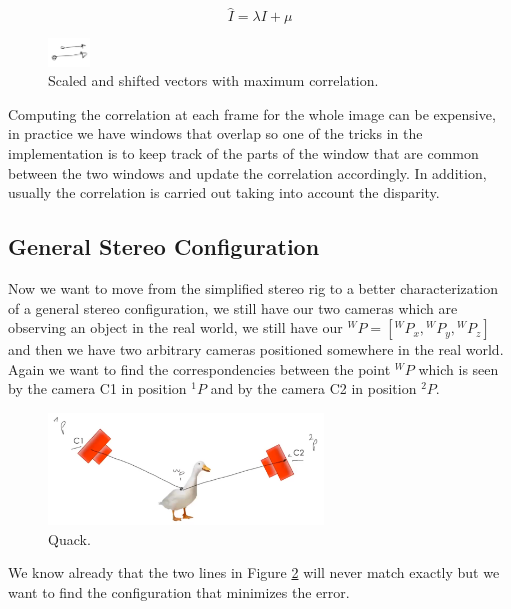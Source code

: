 \begin{multicols}{2}
\[
\hat{I} = \lambda I + \mu
\]
\begin{figure}[H]
    \centering
    \includegraphics[width=0.1\textwidth]{Figures/vectors.png}
    \caption{Scaled and shifted vectors with maximum correlation.}
    \label{fig:vectors}
\end{figure}
\end{multicols}

Computing the correlation at each frame for the whole image
can be expensive, in practice we have windows that overlap so one of the tricks in the implementation is to keep track of the parts of the window that are common between the two windows and update the correlation accordingly. In addition, usually the correlation is carried out taking into account the disparity.

\subsection{General Stereo Configuration}

Now we want to move from the simplified stereo rig to a better characterization of a general stereo configuration, we still have our two cameras which are observing an object in the real world, we still have our \({}^WP=[{}^WP_x, {}^WP_y,{}^WP_z]\) and then we have two arbitrary cameras positioned somewhere in the real world. Again we want to find the correspondencies between the point \({}^WP\) which is seen by the camera C1 in position \({}^1P\) and by the camera C2 in position \({}^2P\).

\begin{figure}[H]
    \centering
    \includegraphics[width=0.65\textwidth]{Figures/duck.png}
    \caption{Quack.}
    \label{fig:duck}
\end{figure}

We know already that the two lines in Figure \ref{fig:duck} will never match exactly but we want to find the configuration that minimizes the error.


